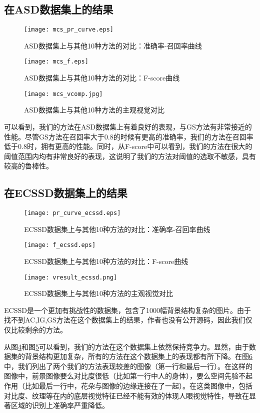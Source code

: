 \subsection{在ASD数据集上的结果}
\begin{figure}
\centering
\texttt{[image: mcs\_pr\_curve.eps]}
\caption{ASD数据集上与其他10种方法的对比：准确率-召回率曲线}
\label{fig:results2_pr}
\end{figure}
\begin{figure}
\centering
\texttt{[image: mcs\_f.eps]}
\caption{ASD数据集上与其他10种方法的对比：F-score曲线}
\label{fig:results2_fscore}
\end{figure}
\begin{figure}
\centering
\texttt{[image: mcs\_vcomp.jpg]}
\caption{ASD数据集上与其他10种方法的主观视觉对比}\label{fig:vresult2}
\end{figure}

可以看到，我们的方法在ASD数据集上有着良好的表现，与GS方法有非常接近的性能。尽管GS方法在召回率大于0.8的时候有更高的准确率，我们的方法在召回率低于0.8时，拥有更高的性能。同时，从F-score中可以看到，我们的方法在很大的阈值范围内均有非常良好的表现，这说明了我们的方法对阈值的选取不敏感，具有较高的鲁棒性。

\subsection{在ECSSD数据集上的结果}
\begin{figure}
\centering
\texttt{[image: pr\_curve\_ecssd.eps]}
\caption{ECSSD数据集上与其他10种方法的对比：准确率-召回率曲线}
\label{fig:results2_pr_ecssd}
\end{figure}
\begin{figure}
\centering
\texttt{[image: f\_ecssd.eps]}
\caption{ECSSD数据集上与其他10种方法的对比：F-score曲线}
\label{fig:results2_fscore_ecssd}
\end{figure}
\begin{figure}
\centering
\texttt{[image: vresult\_ecssd.png]}
\caption{ECSSD数据集上与其他10种方法的主观视觉对比}\label{fig:vresult2_ecssd}
\end{figure}

ECSSD是一个更加有挑战性的数据集，包含了1000幅背景结构复杂的图片。由于找不到AC,IG,GS方法在这个数据集上的结果，作者也没有公开源码，因此我们仅仅比较剩余的方法。

从图\ref{fig:results2_pr_ecssd}和图\ref{fig:results2_fscore_ecssd}可以看到，我们的方法在这个数据集上依然保持竞争力。显然，由于数据集的背景结构更加复杂，所有的方法在这个数据集上的表现都有所下降。在图\ref{fig:vresult2_ecssd}中，我们列出了两个我们的方法表现较差的图像（第一行和最后一行）。在这样的图像中，前景图像要么对比度很低（比如第一行中人的身体），要么空间先验不起作用（比如最后一行中，花朵与图像的边缘连接在了一起）。在这类图像中，包括对比度、纹理等在内的底层视觉特征已经不能有效的体现人眼视觉特性，导致在显著区域的识别上准确率严重降低。

